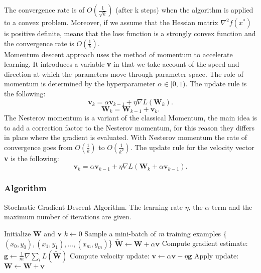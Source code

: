 The convergence rate is of $O(\frac{1}{\sqrt{k}})$ (after k steps) when the algorithm is applied to a convex problem. 
Moreover, if we assume that the Hessian matrix $\nabla^2f(x^*)$ is positive definite, means that the loss function is a strongly convex function and the convergence rate is $O(\frac{1}{k})$. \cite{goodfellow}
\\
Momentum descent approach uses the method of momentum to accelerate learning. It introduces a variable \textbf{v} in that we take account of the speed and direction at which the parameters move through parameter space. The role of momentum is determined by the hyperparameter $\alpha\in[0,1)$.
The update rule is the following:
\begin{equation}
\label{classical_momentum}
\textbf{v}_k = \alpha\textbf{v}_{k-1} + \eta\nabla\textit{L}(\textbf{W}_k).
\end{equation}
\begin{equation}
\label{update_momentum}
\textbf{W}_k = \textbf{W}_{k-1}  + \textbf{v}_k.
\end{equation}
The Nesterov momentum is a variant of the classical Momentum, the main idea is to add a correction factor to the Nesterov momentum,  for this reason they differs in place where the gradient is evaluated. With Nesterov momentum the rate of convergence goes from $O(\frac{1}{k})$ to $O(\frac{1}{k^2})$.
The update rule for the velocity vector \textbf{v} is the following:
\begin{equation}
\label{nesterov_momentum}
\textbf{v}_k = \alpha\textbf{v}_{k-1} + \eta\nabla\textit{L}(\textbf{W}_k + \alpha\textbf{v}_{k-1}).
\end{equation}
\subsubsection{Algorithm}
\begin{algorithm}[H]
	\caption{Stochastic Gradient Descent Algorithm. The learning rate $\eta$, the $\alpha$ term and the maximum number of iterations are given.}
	\label{alg:sgd}
	\begin{algorithmic}[1]
		\State Initialize \textbf{W} and \textbf{v}
		\State $k \gets 0$
		\State Sample a mini-batch of \textit{m} training examples \{\textit{$(x_0,y_0),(x_1,y_1),...,(x_m,y_m)$}\}
		\State $\tilde{\textbf{W}} \gets \textbf{W} + \alpha \textbf{v}$
		\EndIf
		\State Compute gradient estimate: $\textbf{g} \gets \frac {1}{m} \nabla \sum_i\textit{L}(\tilde{\textbf{W}})$
		\State Compute velocity update: $\textbf{v} \gets \alpha \textbf{v} - \eta \textbf{g}$
		\State Apply update: $\textbf{W} \gets \textbf{W} + \textbf{v}$
		\EndWhile
		\EndProcedure
	\end{algorithmic}
\end{algorithm}

